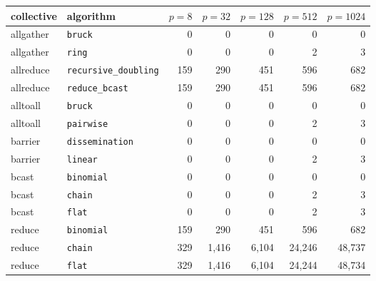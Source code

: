 \begin{tabular}{llrrrrr}
\toprule
collective & algorithm & $p{=}8$ & $p{=}32$ & $p{=}128$ & $p{=}512$ & $p{=}1024$ \\
\midrule
allgather & \texttt{bruck} & 0 & 0 & 0 & 0 & 0 \\
allgather & \texttt{ring} & 0 & 0 & 0 & 2 & 3 \\
allreduce & \texttt{recursive\_doubling} & 159 & 290 & 451 & 596 & 682 \\
allreduce & \texttt{reduce\_bcast} & 159 & 290 & 451 & 596 & 682 \\
alltoall & \texttt{bruck} & 0 & 0 & 0 & 0 & 0 \\
alltoall & \texttt{pairwise} & 0 & 0 & 0 & 2 & 3 \\
barrier & \texttt{dissemination} & 0 & 0 & 0 & 0 & 0 \\
barrier & \texttt{linear} & 0 & 0 & 0 & 2 & 3 \\
bcast & \texttt{binomial} & 0 & 0 & 0 & 0 & 0 \\
bcast & \texttt{chain} & 0 & 0 & 0 & 2 & 3 \\
bcast & \texttt{flat} & 0 & 0 & 0 & 2 & 3 \\
reduce & \texttt{binomial} & 159 & 290 & 451 & 596 & 682 \\
reduce & \texttt{chain} & 329 & 1,416 & 6,104 & 24,246 & 48,737 \\
reduce & \texttt{flat} & 329 & 1,416 & 6,104 & 24,244 & 48,734 \\
\bottomrule
\end{tabular}

